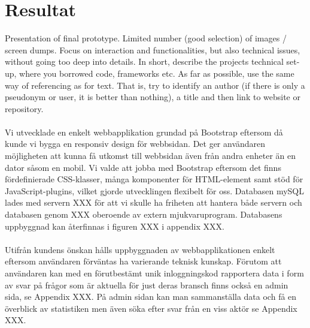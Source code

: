 \documentclass[12pt]{article}
\begin{document}
\section{Resultat}
Presentation of final prototype. Limited number (good selection) of images / screen dumps. Focus on interaction and functionalities, but also technical issues, without going too deep into details. In short, describe the projects technical set-up, where you borrowed code, frameworks etc. As far as possible, use the same way of referencing as for text. That is, try to identify an author (if there is only a pseudonym or user, it is better than nothing), a title and then link to website or repository.\\\\
Vi utvecklade en enkelt webbapplikation grundad på Bootstrap eftersom då kunde vi bygga en responsiv design för webbsidan. Det ger användaren möjligheten att kunna få utkomst till webbsidan även från andra enheter än en dator såsom en mobil. Vi valde att jobba med Bootstrap eftersom det finns fördefinierade CSS-klasser, många komponenter för HTML-element samt stöd för JavaScript-plugins, vilket gjorde utvecklingen flexibelt för oss. Databasen mySQL lades med servern XXX för att vi skulle ha friheten att hantera både servern och databasen genom XXX oberoende av extern mjukvaruprogram. Databasens uppbyggnad kan återfinnas i figuren XXX i appendix XXX.\\\\
Utifrån kundens önskan hålls uppbyggnaden av webbapplikationen enkelt eftersom användaren förväntas ha varierande teknisk kunskap. Förutom att användaren kan med en förutbestämt unik inloggningskod rapportera data i form av svar på frågor som är aktuella för just deras bransch finns också en admin sida, se Appendix XXX. På admin sidan kan man sammanställa data och få en överblick av statistiken men även söka efter svar från en viss aktör se Appendix XXX. 
\end{document}
